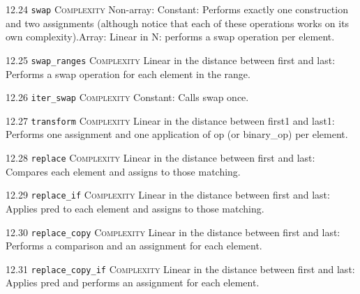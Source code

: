 \noindent\textcolor{corange}{12.24 \texttt{swap}} \textsc{Complexity} Non-array: Constant: Performs exactly one construction and two assignments (although notice that each of these operations works on its own complexity).Array: Linear in N: performs a swap operation per element. \vspace{0.5em}

\noindent\textcolor{corange}{12.25 \texttt{swap\_ranges}} \textsc{Complexity} Linear in the distance between first and last: Performs a swap operation for each element in the range. \vspace{0.5em}

\noindent\textcolor{cgreen}{12.26 \texttt{iter\_swap}} \textsc{Complexity} Constant: Calls swap once. \vspace{0.5em}

\noindent\textcolor{corange}{12.27 \texttt{transform}} \textsc{Complexity} Linear in the distance between first1 and last1: Performs one assignment and one application of op (or binary\_op) per element. \vspace{0.5em}

\noindent\textcolor{corange}{12.28 \texttt{replace}} \textsc{Complexity} Linear in the distance between first and last: Compares each element and assigns to those matching. \vspace{0.5em}

\noindent\textcolor{corange}{12.29 \texttt{replace\_if}} \textsc{Complexity} Linear in the distance between first and last: Applies pred to each element and assigns to those matching. \vspace{0.5em}

\noindent\textcolor{corange}{12.30 \texttt{replace\_copy}} \textsc{Complexity} Linear in the distance between first and last: Performs a comparison and an assignment for each element. \vspace{0.5em}

\noindent\textcolor{corange}{12.31 \texttt{replace\_copy\_if}} \textsc{Complexity} Linear in the distance between first and last: Applies pred and performs an assignment for each element. \vspace{0.5em}

